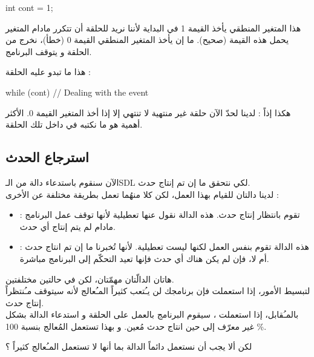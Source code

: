 \begin{Csource}
int cont = 1;
\end{Csource}

هذا المتغير المنطقي يأخذ القيمة 1 في البداية لأننا نريد للحلقة أن تتكرر مادام المتغير
يحمل هذه القيمة (صحيح). ما إن يأخذ المتغير المنطقي القيمة 0 (خطأ)، نخرج من الحلقة و يتوقف البرنامج.

هذا ما تبدو عليه الحلقة :

\begin{Csource}
while (cont)
{
	// Dealing with the event
}
\end{Csource}

هكذا إذاً : لدينا لحدّ الآن حلقة غير منتهية لا تنتهي إلا إذا أخذ المتغير 
القيمة 0. الأكثر أهمية هو ما نكتبه في داخل تلك الحلقة.

\subsection{استرجاع الحدث}

الآن سنقوم باستدعاء دالة من الـ\textenglish{SDL}
لكي نتحقق ما إن تم إنتاج حدث.\\
لدينا دالتان للقيام بهذا العمل، لكن كلا منهُما تعمل بطريقة مختلفة عن الأخرى :

\begin{itemize}
	\item {} :
	تقوم بانتظار إنتاج حدث. هذه الدالة نقول عنها تعطيلية لأنها توقف عمل البرنامج مادام لم يتم إنتاج أي حدث.
	\item {} :
	هذه الدالة تقوم بنفس العمل لكنها ليست تعطيلية. لأنها تُخبرنا ما إن تم انتاج حدث أم لا، فإن لم يكن هناك أي حدث فإنها تعيد التحكّم إلى البرنامج مباشرة.
\end{itemize}

هاتان الدالّتان مهمّتان، لكن في حالتين مختلفتين.\\
لتبسيط الأمور، إذا استعملت 
فإن برنامجك لن يـُتعب كثيراً المـُعالج لأنه سيتوقف مـُنتظراً إنتاج حدث.\\
بالمـُقابل، إذا استعملت 
،
سيقوم البرنامج بالعمل على الحلقة
و استدعاء الدالة 
بشكل غير معرّف إلى حين انتاج حدث مُعين. و بهذا تستعمل المُعالج  بنسبة 100
\%.

\begin{question}
لكن ألا يجب أن نستعمل دائماً الدالة 
بما أنها لا تستعمل المـُعالج كثيراً ؟
\end{question}

